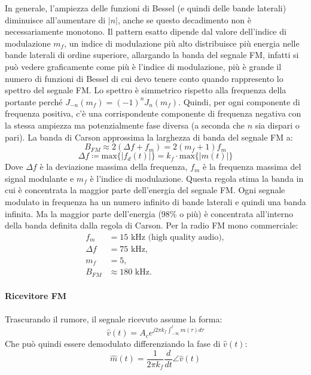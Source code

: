 In generale, l'ampiezza delle funzioni di Bessel (e quindi delle bande laterali) diminuisce all'aumentare di \( |n| \), anche se questo decadimento non è necessariamente monotono.
Il pattern esatto dipende dal valore dell'indice di modulazione \( m_f \), un indice di modulazione più alto distribuisce più energia nelle bande laterali di ordine superiore, allargando la banda del segnale FM,
infatti si può vedere graficamente come più è l'indice di modulazione, più è grande il numero di funzioni di Bessel di cui devo tenere conto quando rappresento lo spettro del segnale FM.
Lo spettro è simmetrico rispetto alla frequenza della portante perché \( J_{-n}(m_f) = (-1)^n J_n(m_f) \). Quindi, per ogni componente di frequenza positiva, c'è una corrispondente componente di frequenza negativa con la stessa ampiezza ma potenzialmente fase diversa (a seconda che \( n \) sia dispari o pari).
La banda di Carson approssima la larghezza di banda del segnale FM a:
\[
    B_{FM} \approx 2(\Delta f + f_{m}) = 2(m_f + 1) f_{m}
\]
\[
    \Delta f \coloneqq \text{max} \{ | f_d(t) | \} = k_f \cdot \text{max} \{ | m(t) | \}
\]
Dove \( \Delta f \) è la deviazione massima della frequenza, \( f_{m} \) è la frequenza massima del signal modulante e \( m_f \) è l'indice di modulazione.
Questa regola stima la banda in cui è concentrata la maggior parte dell'energia del segnale FM.
Ogni segnale modulato in frequenza ha un numero infinito di bande laterali e quindi una banda infinita. Ma la maggior parte dell'energia (98\% o più) è concentrata all'interno della banda definita dalla regola di Carson. Per la radio FM mono commerciale:
\begin{align*}
f_m &= 15 \text{ kHz (high quality audio)}, \\
\Delta f &= 75 \text{ kHz}, \\
m_f &= 5, \\
B_{FM} &\approx 180 \text{ kHz}.
\end{align*}

\paragraph*{Ricevitore FM}
Trascurando il rumore, il segnale ricevuto assume la forma:
\[
\hat{v}(t) = A_c e^{j2\pi k_f \int_{-\infty}^{t} m(\tau) d\tau}
\]
Che può quindi essere demodulato differenziando la fase di \( \hat{v}(t) \):
\[
\hat{m}(t) = \frac{1}{2\pi k_f} \frac{d}{dt} \angle \hat{v}(t)
\]


